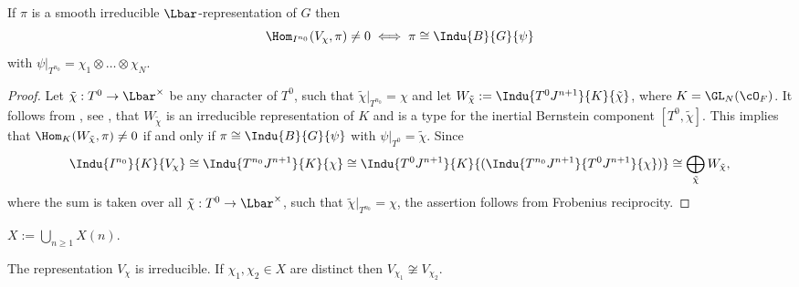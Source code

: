 \begin{prop}\label{types_prince} If $\pi$ is a smooth irreducible $\Lbar$-representation of $G$ then
\[
\Hom_{I^{n_0}}( V_{\chi}, \pi)\neq 0 \iff\pi\cong \Indu{B}{G}{\psi}
\]
with $\psi|_{T^{n_0}}= \chi_1\otimes\ldots\otimes \chi_N$.
\end{prop}

\begin{proof} Let $\tilde{\chi}: T^0\to \Lbar^{\times}$ be any character of $T^0$, such that $\tilde{\chi}|_{T^{n_0}}=\chi$ and let $W_{\tilde{\chi}}:=\Indu{T^0 J^{n+1}}{K}{\tilde{\chi}}$,
where $K=\GL_N(\cO_F)$. It follows from \cite{BK_cover}, see \cite[Prop.\,3.10]{HS}, that $W_{\tilde{\chi}}$ is an irreducible representation of $K$ and is a type for the inertial Bernstein
component $[T^0, \tilde{\chi}]$. This implies that $\Hom_{K}(W_{\tilde{\chi}}, \pi)\neq 0$ if and only if $\pi\cong \Indu{B}{G}{\psi}$ with $\psi|_{T^{0}}= \tilde{\chi}$. Since
\begin{equation}\label{induce_up}
\Indu{I^{n_0}}{K}{V_\chi}\cong \Indu{T^{n_0} J^{n+1}}{K}{\chi}\cong \Indu{T^0J^{n+1}}{K}{(\Indu{T^{n_0} J^{n+1}}{T^0 J^{n+1}}{\chi})}\cong \bigoplus_{\tilde{\chi}} W_{\tilde{\chi}},
\end{equation}
where the sum is taken over all $\tilde{\chi}: T^0\to \Lbar^{\times}$, such that $\tilde{\chi}|_{T^{n_0}}= \chi$, the assertion follows from Frobenius reciprocity.
\end{proof}

\begin{defi} $X:= \bigcup_{n\ge 1} X(n)$.
\end{defi}

\begin{lem}\label{irreducible_distinct} The representation $V_{\chi}$ is irreducible. If $\chi_1, \chi_2\in X$ are distinct then $V_{\chi_1}\not \cong V_{\chi_2}$.
\end{lem}

